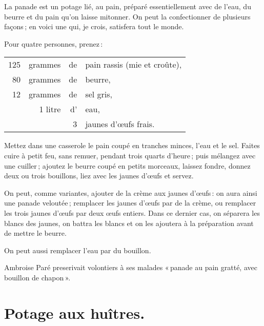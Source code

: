 La panade est un potage lié, au pain, préparé essentiellement avec de l'eau, du
beurre et du pain qu'on laisse mitonner. On peut la confectionner de plusieurs
façons ; en voici une qui, je crois, satisfera tout le monde.

\medskip

Pour quatre personnes, prenez :

\medskip

\footnotesize
\begin{longtable}{rrrp{16em}}                                                                             \\
   125 & grammes  & de & pain rassis (mie et croûte),                                                     \\
    80 & grammes  & de & beurre,                                                                          \\
    12 & grammes  & de & sel gris,                                                                        \\
       &  1 litre & d' & eau,                                                                             \\
       &          &  3 & jaunes d'œufs frais.                                                             \\
\end{longtable}
\normalsize

Mettez dans une casserole le pain coupé en tranches minces, l’eau et le sel.
Faites cuire à petit feu, sans remuer, pendant trois quarts d'heure ; puis
mélangez avec une cuiller ; ajoutez le beurre coupé en petits morceaux, laissez
fondre, donnez deux ou trois bouillons, liez avec les jaunes d'œufs et servez.

\sk

On peut, comme variantes, ajouter de la crème aux jaunes d'œufs : on aura ainsi
une panade veloutée ; remplacer les jaunes d'œufs par de la crème, ou remplacer
les trois jaunes d'œufs par deux œufs entiers. Dans ce dernier cas, on séparera
les blancs des jaunes, on battra les blancs et on les ajoutera à la préparation
avant de mettre le beurre.

On peut aussi remplacer l’eau par du bouillon.

Ambroise Paré preserivait volontiers à ses malades « panade au pain gratté, avec
bouillon de chapon ».

\section*{\centering Potage aux huîtres.}

